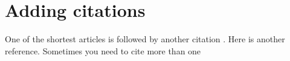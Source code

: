 \documentclass[12pt]{article}
\begin{document}

\section*{Adding citations}
One of the shortest articles \cite{lander1966counterexample} is followed by another citation \cite{ulmer1951protein}. Here is another reference. Sometimes you need to cite more than one \cite{lander1966counterexample,ulmer1951protein,hakkio1986does}

\printbibliography

\end{document}
